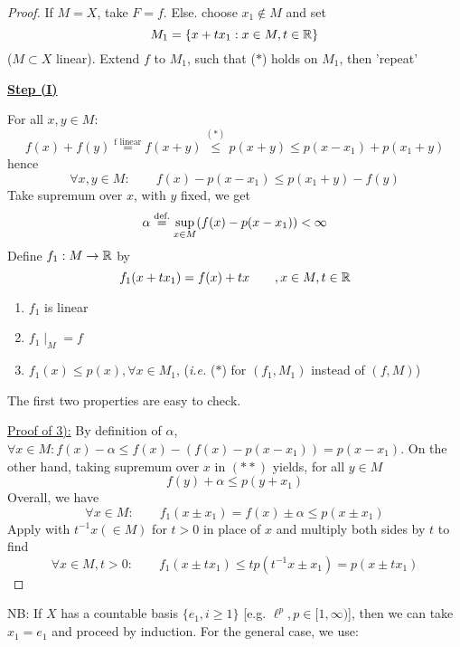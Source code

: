 \documentclass{article}
\begin{document}
\begin{proof}
    If $M=X$, take $F=f$. Else. choose $x_1 \notin M$ and set  
    $$
    M_1 = \{x+tx_1: x\in M, t\in \mathbb{R}\}
    $$
    ($M\subset X$ linear). Extend $f$ to $M_1$, such that ($*$) holds on $M_1$, then 'repeat'  

    \underline{\textbf{Step (I)}}\nl
    
    For all $x,y \in M$: 
    $$
    f(x)+f(y) \overset{\text{f \ linear}}{=} f(x+y) \overset{(*)}{\leq} p(x+y) \leq p(x-x_1)+p(x_1+y)
    $$
    hence 
    \begin{equation*}
        \forall x,y\in M: \qquad f(x)-p(x-x_1) \leq p(x_1+y) - f(y) \tag{$**$}
    \end{equation*}
    Take supremum over $x$, with $y$ fixed, we get  
    $$
    \alpha \stackrel{\text{def.}}{=} \sup_{x\in M} (f(x)-p(x-x_1)) < \infty
    $$
    Define $f_1: M\to \mathbb{R}$ by  
    $$
    f_1(x+tx_1) = f(x) + tx \qquad ,x\in M, t\in \mathbb{R}
    $$
    \begin{lemma}
    \phantom{something}
        \begin{enumerate}[1)]
            \item $f_1$ is linear
            \item $f_1 \mid_M=f$ 
            \item $f_1(x) \leq p(x), \forall x \in M_1$, (\textit{i.e.} ($*$) for $(f_1, M_1)$ instead of $(f, M)$)
        \end{enumerate}
    \end{lemma}
    The first two properties are easy to check.  
    
    \underline{Proof of 3):}\nl
    By definition of $\alpha$, $\forall x \in M: f(x)-\alpha \leq f(x)-( f(x)-p(x-x_1)) = p(x-x_1)$. On the other hand, taking supremum over $x$ in $(**)$ yields, for all $y \in M$  
    $$
    f(y) + \alpha \leq p(y+x_1)
    $$  
    Overall, we have  
    $$
    \forall x\in M: \qquad f_1(x\pm x_1) = f(x) \pm \alpha \leq p(x \pm x_1)
    $$  
    Apply with $t^{-1}x(\in M)$ for $t > 0$ in place of $x$ and multiply both sides by $t$ to find  
    $$
    \forall x \in M, t>0: \qquad f_1(x \pm tx_1) \leq tp(t^{-1}x\pm x_1)=p(x\pm tx_1)
    $$
\end{proof}

NB: If $X$ has a countable basis $\{e_1, i\geq 1\}$ [e.g. $\ell^p, p\in [1,\infty)$], then we can take $x_1=e_1$ and proceed by induction. For the general case, we use:
\end{document}
